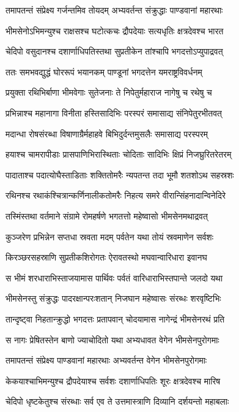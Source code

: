 \twolineshloka
{तमापतन्तं संप्रेक्ष्य गर्जन्तमिव तोयदम्}
{अभ्यवर्तन्त संक्रुद्धाः पाण्डवानां महारथाः}


\twolineshloka
{भीमसेनोऽभिमन्युश्च राक्षसश्च घटोत्कचः}
{द्रौपदेयाः सत्यधृतिः क्षत्रदेवश्च भारत}


\twolineshloka
{चेदिपो वसुदानश्च दशार्णाधिपतिस्तथा}
{सुप्रतीकेन तांश्चापि भगदत्तोऽप्युपाद्रवत्}


\twolineshloka
{ततः समभवद्युद्धं घोररूपं भयानकम्}
{पाण्डूनां भगदत्तेन यमराष्ट्रविवर्धनम्}


\twolineshloka
{प्रयुक्ता रथिभिर्बाणा भीमवेगाः सुतेजनाः}
{ते निपेतुर्महाराज नागेषु च रथेषु च}


\twolineshloka
{प्रभिन्नाश्च महानागा विनीता हस्तिसादिभिः}
{परस्परं समासाद्य संनिपेतुरभीतवत्}


\twolineshloka
{मदान्धा रोषसंरब्धा विषाणाग्रैर्महाहवे}
{बिभिदुर्दन्तमुसलैः समासाद्य परस्परम्}


\twolineshloka
{हयाश्च चामरापीडाः प्रासपाणिभिरास्थिताः}
{चोदिताः सादिभिः क्षिप्रं निजघ्रुरितरेतरम्}


\twolineshloka
{पादाताश्च पदात्योघैस्ताडिताः शक्तितोमरैः}
{न्यपतन्त तदा भूमौ शतशोऽथ सहस्रशः}


\twolineshloka
{रथिनश्च रथाकंश्चित्रान्कर्णिनालीकतोमरैः}
{निहत्य समरे वीरान्सिंहनादान्विनेदिरे}


\twolineshloka
{तस्मिंस्तथा वर्तमाने संग्रामे रोमहर्षणे}
{भगतत्तो महेष्वासो भीमसेनमथाद्रवत्}


\twolineshloka
{कुञ्जरेण प्रभिन्नेन सप्तधा स्रवता मदम्}
{पर्वतेन यथा तोयं स्रवमाणेन सर्वशः}


\twolineshloka
{किरञ्छरसहस्राणि सुप्रतीकशिरोगतः}
{ऐरावतस्थो मघवान्वारिधारा इवानघ}


\twolineshloka
{स भीमं शरधाराभिस्ताजयामास पार्थिवः}
{पर्वतं वारिधाराभिस्तपान्ते जलदो यथा}


\twolineshloka
{भीमसेनस्तु संक्रुद्धः पादरक्षान्परःशतान्}
{निजघान महेष्वासः संरब्धः शरवृष्टिभिः}


\twolineshloka
{तान्दृष्ट्वा निहतान्क्रुद्धो भगदत्तः प्रतापवान्}
{चोदयामास नागेन्द्रं भीमसेनरथं प्रति}


\twolineshloka
{स नागः प्रेषितस्तेन बाणो ज्याचोदितो यथा}
{अभ्यधावत वेगेन भीमसेनपुरोगमाः}


\twolineshloka
{तमापतन्तं संप्रेक्ष्य पाण्डवानां महारथाः}
{अभ्यवर्तन्त वेगेन भीमसेनपुरोगमाः}


\twolineshloka
{केकयाश्चाभिमन्युश्च द्रौपदेयाश्च सर्वशः}
{दशार्णाधिपतिः शूरः क्षत्रदेवश्च मारिष}


\twolineshloka
{चेदिपो धृष्टकेतुश्च संरब्धाः सर्व एव ते}
{उत्तमास्त्राणि दिव्यानि दर्शयन्तो महाबलाः}


